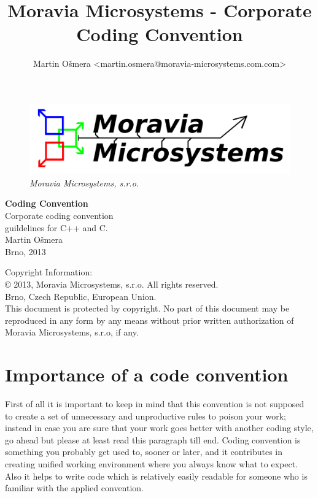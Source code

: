 \documentclass[a4paper,twoside,15pt]{book}
\title{Moravia Microsystems - Corporate Coding Convention}
\author{Martin Ošmera <martin.osmera@moravia-microsystems.com.com>}
\begin{document}
\begin{titlepage}
        \begin{figure}[ht!]
                \centering{}
                \includegraphics[width=.9\textwidth]{Moravia_Microsystems.png}
                \caption{\textit{Moravia Microsystems, s.r.o.}}
        \end{figure}
        \begin{center}
                \fontsize{35.83pt}{60pt} \selectfont{}
                \textbf{Coding Convention}
                \\[2cm]
                \fontsize{25pt}{30pt} \selectfont{}
                Corporate coding convention\\
                guildelines for C++ and C.
                \\[1cm]
                \fontsize{15pt}{19pt} \selectfont{}
                Martin Ošmera\\
                Brno, 2013
        \end{center}
\end{titlepage}

Copyright Information:
\\
\copyright{} 2013, Moravia Microsystems, s.r.o. All rights reserved.\\
Brno, Czech Republic, European Union.
\\
This document is protected by copyright. No part of this document may be reproduced in any form by any means
without prior written authorization of Moravia Microsystems, s.r.o, if any.

\tableofcontents

\chapter{Importance of a code convention}
    First of all it is important to keep in mind that this convention is not supposed to create a set of unnecessary and unproductive rules to poison your work; instead in case you are sure that your work goes better with another coding style, go ahead but please at least read this paragraph till end. Coding convention is something you probably get used to, sooner or later, and it contributes in creating unified working environment where you always know what to expect. Also it helps to write code which is relatively easily readable for someone who is familiar with the applied convention.
\end{document}
